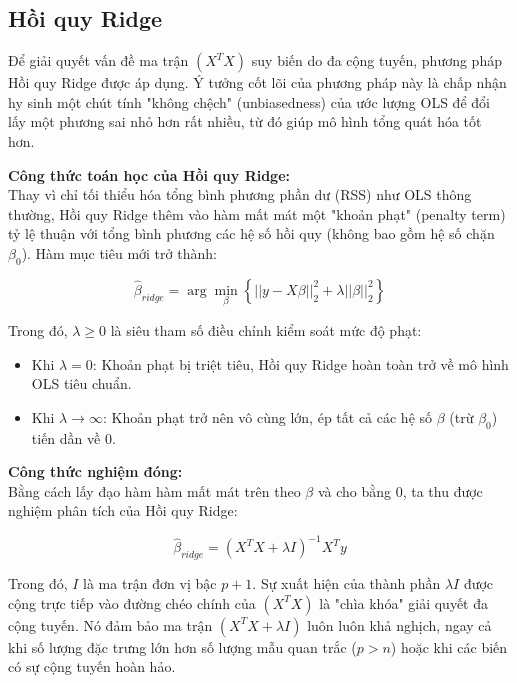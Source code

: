 \subsection{Hồi quy Ridge}

Để giải quyết vấn đề ma trận $(X^T X)$ suy biến do đa cộng tuyến, phương pháp Hồi quy Ridge được áp dụng. Ý tưởng cốt lõi của phương pháp này là chấp nhận hy sinh một chút tính "không chệch" (unbiasedness) của ước lượng OLS để đổi lấy một phương sai nhỏ hơn rất nhiều, từ đó giúp mô hình tổng quát hóa tốt hơn.

\textbf{Công thức toán học của Hồi quy Ridge:} \\
Thay vì chỉ tối thiểu hóa tổng bình phương phần dư (RSS) như OLS thông thường, Hồi quy Ridge thêm vào hàm mất mát một "khoản phạt" (penalty term) tỷ lệ thuận với tổng bình phương các hệ số hồi quy (không bao gồm hệ số chặn $\beta_0$). Hàm mục tiêu mới trở thành:

\begin{equation}
    \hat{\beta}_{ridge} = \arg \min_{\beta} \left\{ ||y - X\beta||_2^2 + \lambda ||\beta||_2^2 \right\}
\end{equation}

Trong đó, $\lambda \ge 0$ là siêu tham số điều chỉnh kiểm soát mức độ phạt:
\begin{itemize}
    \item Khi $\lambda = 0$: Khoản phạt bị triệt tiêu, Hồi quy Ridge hoàn toàn trở về mô hình OLS tiêu chuẩn.
    \item Khi $\lambda \rightarrow \infty$: Khoản phạt trở nên vô cùng lớn, ép tất cả các hệ số $\beta$ (trừ $\beta_0$) tiến dần về 0.
\end{itemize}

\textbf{Công thức nghiệm đóng:} \\
Bằng cách lấy đạo hàm hàm mất mát trên theo $\beta$ và cho bằng 0, ta thu được nghiệm phân tích của Hồi quy Ridge:

\begin{equation}
    \hat{\beta}_{ridge} = (X^T X + \lambda I)^{-1} X^T y
\end{equation}

Trong đó, $I$ là ma trận đơn vị bậc $p+1$. Sự xuất hiện của thành phần $\lambda I$ được cộng trực tiếp vào đường chéo chính của $(X^T X)$ là "chìa khóa" giải quyết đa cộng tuyến. Nó đảm bảo ma trận $(X^T X + \lambda I)$ luôn luôn khả nghịch, ngay cả khi số lượng đặc trưng lớn hơn số lượng mẫu quan trắc ($p > n$) hoặc khi các biến có sự cộng tuyến hoàn hảo.

